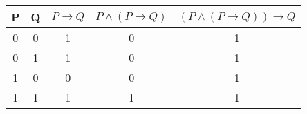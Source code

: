\documentclass{jarticle}
\begin{document}
	\begin{table}[htbp]
		\begin{tabular}{|c|c||c|c|c|} \hline
		P & Q & \(P \to Q\) & \(P \land (P \to Q)\) & \((P \land (P \to Q)) \to Q\) \\ \hline
		0 & 0 &           1 &                      0 &                              1 \\ \hline
		0 & 1 &           1 &                      0 &                              1 \\ \hline \hline
		1 & 0 &           0 &                      0 &                              1 \\ \hline \hline
		1 & 1 & 	  1 &                      1 &                              1 \\ \hline
		\end{tabular}
	\end{table}
\end{document}
